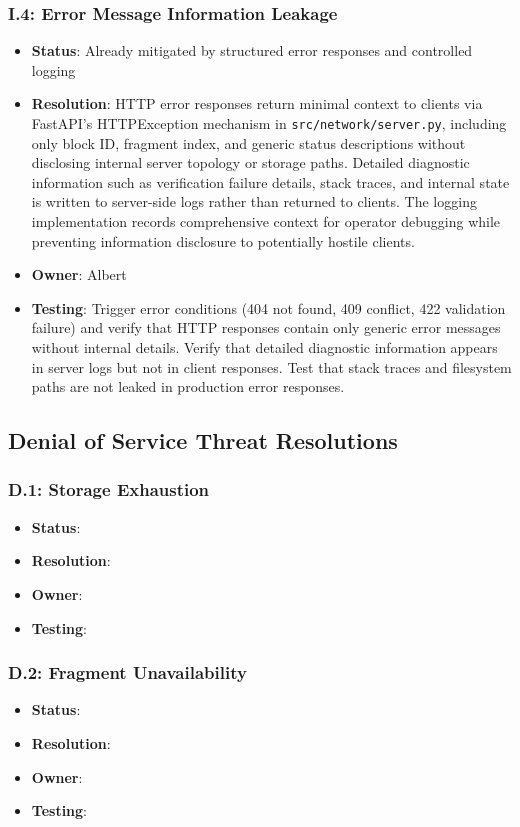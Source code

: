 \documentclass[../veristore_security_model.tex]{subfiles}
\begin{document}
\subsubsection{I.4: Error Message Information Leakage}
\begin{itemize}
\item \textbf{Status}: Already mitigated by structured error responses and controlled logging
\item \textbf{Resolution}: HTTP error responses return minimal context to clients via FastAPI's HTTPException mechanism in \texttt{src/network/server.py}, including only block ID, fragment index, and generic status descriptions without disclosing internal server topology or storage paths. Detailed diagnostic information such as verification failure details, stack traces, and internal state is written to server-side logs rather than returned to clients. The logging implementation records comprehensive context for operator debugging while preventing information disclosure to potentially hostile clients.
\item \textbf{Owner}: Albert
\item \textbf{Testing}: Trigger error conditions (404 not found, 409 conflict, 422 validation failure) and verify that HTTP responses contain only generic error messages without internal details. Verify that detailed diagnostic information appears in server logs but not in client responses. Test that stack traces and filesystem paths are not leaked in production error responses.
\end{itemize}

\subsection{Denial of Service Threat Resolutions}

\subsubsection{D.1: Storage Exhaustion}
\begin{itemize}
\item \textbf{Status}: %
\item \textbf{Resolution}: %
\item \textbf{Owner}: %
\item \textbf{Testing}: %
\end{itemize}

\subsubsection{D.2: Fragment Unavailability}
\begin{itemize}
\item \textbf{Status}: %
\item \textbf{Resolution}: %
\item \textbf{Owner}: %
\item \textbf{Testing}: %
\end{itemize}
\end{document}
